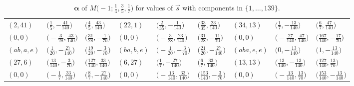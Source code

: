 \documentclass[pdftex]{sigma}
\theoremstyle{definition}
\numberwithin{equation}{section}
\begin{document}
\begin{landscape}
\begin{table}[th]
\begin{tabular}{|lll|lll|lll|}
\\
$(2, 41)$ & $\bigl(\frac{1}{5}, -\frac{41}{140}\bigr)$ & $\bigl(\frac{4}{5}, \frac{43}{140}\bigr)$ & $(22, 1)$ & $\bigl(\frac{2}{35}, -\frac{1}{140}\bigr)$ & $\bigl(\frac{33}{35}, \frac{23}{140}\bigr)$ & $(34, 13)$ & $\bigl(\frac{1}{7}, -\frac{13}{140}\bigr)$ & $\bigl(\frac{6}{7}, \frac{47}{140}\bigr)$
\\
$(0, 0)$ & $\bigl(-\frac{3}{28}, \frac{43}{140}\bigr)$ & $\bigl(\frac{31}{28}, -\frac{1}{70}\bigr)$ & $(0, 0)$ & $\bigl(-\frac{3}{28}, \frac{23}{140}\bigr)$ & $\bigl(\frac{31}{28}, -\frac{11}{70}\bigr)$ & $(0, 0)$ & $\bigl(-\frac{27}{140}, \frac{47}{140}\bigr)$ & $\bigl(\frac{167}{140}, -\frac{17}{70}\bigr)$
\\\hline
$(ab, a, e)$ & $\bigl(\frac{1}{20}, -\frac{27}{140}\bigr)$ & $\bigl(\frac{19}{20}, -\frac{3}{70}\bigr)$ & $(ba, b, e)$ & $\bigl(-\frac{1}{20}, -\frac{3}{70}\bigr)$ & $\bigl(\frac{21}{20}, -\frac{27}{140}\bigr)$ & $(aba, e, e)$ & $\bigl(0, -\frac{13}{140}\bigr)$ & $\bigl(1, -\frac{13}{140}\bigr)$
\\
$(27, 6)$ & $\bigl(\frac{13}{140}, -\frac{3}{70}\bigr)$ & $\bigl(\frac{127}{140}, \frac{33}{140}\bigr)$ & $(6, 27)$ & $\bigl(\frac{1}{7}, -\frac{27}{140}\bigr)$ & $\bigl(\frac{6}{7}, \frac{33}{140}\bigr)$ & $(13, 13)$ & $\bigl(\frac{13}{140}, -\frac{13}{140}\bigr)$ & $\bigl(\frac{127}{140}, \frac{13}{70}\bigr)$
\\
$(0, 0)$ & $\bigl(-\frac{1}{7}, \frac{33}{140}\bigr)$ & $\bigl(\frac{8}{7}, -\frac{27}{140}\bigr)$ & $(0, 0)$ & $\bigl(-\frac{13}{140}, \frac{33}{140}\bigr)$ & $\bigl(\frac{153}{140}, -\frac{3}{70}\bigr)$ & $(0, 0)$ & $\bigl(-\frac{13}{140}, \frac{13}{70}\bigr)$ & $\bigl(\frac{153}{140}, -\frac{13}{140}\bigr)$
\\\hline
\end{tabular}
\caption{$\boldsymbol{\alpha}$ of $M\bigl( -1;\frac{1}{4},\frac{3}{5}, \frac{1}{7} \bigr)$ for values of $\vec{s}$ with components in $\{1,\dots,139\}$.} \label{tab:SstarBriesk}
 \end{table}


\end{landscape}
\end{document}
